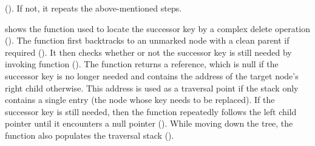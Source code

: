 (). If not, it repeats the above-mentioned steps.



 shows the function \SeekForSuccessor{} used to locate the successor key by a complex delete operation (). The function first backtracks to an unmarked node with a clean parent if required (). It then checks whether or not the successor key is still needed by invoking \NeedSuccessorKey{} function (). The function \NeedSuccessorKey{} returns a reference, which is null if the successor key is no longer needed and contains the address of the target node's right child otherwise. This address is used as a traversal point if the stack only contains a single entry (the node whose key needs to be replaced). If the successor key is still needed, then the function repeatedly follows the left child pointer until it encounters a null pointer (). While moving down the tree, the function also populates the traversal stack ().